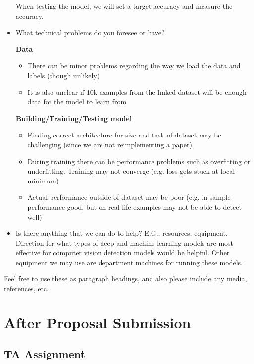 \begin{itemize}
\begin{enumerate}
  \end{enumerate}
  When testing the model, we will set a target accuracy and measure the accuracy. 
  
  \item What technical problems do you foresee or have?
  
\textbf{Data} 
  
  \begin{itemize}
\item There can be minor problems regarding the way we load the data and labels (though unlikely)

\item It is also unclear if 10k examples from the linked dataset will be enough data for the model to learn from
\end {itemize}
\textbf{Building/Training/Testing model}

\begin{itemize}
\item Finding correct architecture for size and task of dataset may be challenging (since we are not reimplementing a paper) 
\item During training there can be performance problems such as overfitting or underfitting. Training may not converge (e.g. loss gets stuck at local minimum) 
\item Actual performance outside of dataset may be poor (e.g. in sample performance good, but on real life examples may not be able to detect well) 
\end{itemize}

  \item Is there anything that we can do to help? E.G., resources, equipment. \\Direction for what types of deep and machine learning models are most effective for computer vision detection models would be helpful. Other equipment we may use are department machines for running these models. 

\end{itemize}

Feel free to use these as paragraph headings, and also please include any media, references, etc.

\section*{After Proposal Submission}

\subsection*{TA Assignment}

